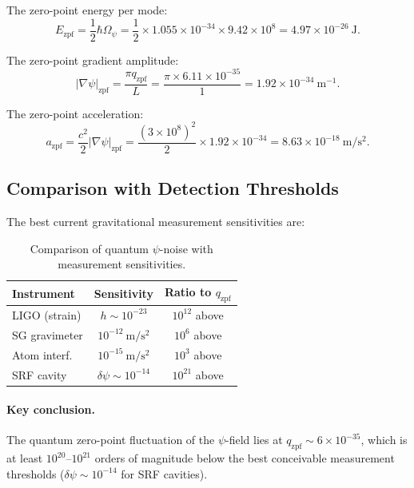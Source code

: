 \documentclass[aps,prd,twocolumn,showpacs,preprintnumbers,superscriptaddress,nofootinbib]{revtex4-2}
\newcommand{\Opsi}{\Omega_\psi}
\begin{document}
The zero-point energy per mode:
\begin{equation}
E_{\mathrm{zpf}} = \frac{1}{2}\hbar\Opsi
  = \frac{1}{2}\times 1.055\times 10^{-34}\times 9.42\times 10^8
  = 4.97\times 10^{-26}~\mathrm{J}.
\end{equation}

The zero-point gradient amplitude:
\begin{equation}
|\nabla\psi|_{\mathrm{zpf}} = \frac{\pi q_{\mathrm{zpf}}}{L}
  = \frac{\pi\times 6.11\times 10^{-35}}{1}
  = 1.92\times 10^{-34}~\mathrm{m^{-1}}.
\end{equation}

The zero-point acceleration:
\begin{equation}
a_{\mathrm{zpf}} = \frac{c^2}{2}|\nabla\psi|_{\mathrm{zpf}}
  = \frac{(3\times 10^8)^2}{2}\times 1.92\times 10^{-34}
  = 8.63\times 10^{-18}~\mathrm{m/s^2}.
\end{equation}

\subsection{Comparison with Detection Thresholds}\label{sec:thresholds}

The best current gravitational measurement sensitivities are:

\begin{table}[h]
\caption{Comparison of quantum $\psi$-noise with measurement sensitivities.}
\label{tab:quantum-compare}
\begin{ruledtabular}
\begin{tabular}{lcc}
Instrument & Sensitivity & Ratio to $q_{\mathrm{zpf}}$ \\
\hline
LIGO (strain) & $h \sim 10^{-23}$ & $10^{12}$ above \\
SG gravimeter & $10^{-12}~\mathrm{m/s^2}$ & $10^{6}$ above \\
Atom interf. & $10^{-15}~\mathrm{m/s^2}$ & $10^{3}$ above \\
SRF cavity & $\delta\psi \sim 10^{-14}$ & $10^{21}$ above \\
\end{tabular}
\end{ruledtabular}
\end{table}

\paragraph{Key conclusion.}
The quantum zero-point fluctuation of the $\psi$-field lies at
$q_{\mathrm{zpf}} \sim 6\times 10^{-35}$, which is at least
$10^{20}$--$10^{21}$ orders of magnitude below the best conceivable
measurement thresholds ($\delta\psi \sim 10^{-14}$ for SRF cavities).
\end{document}
